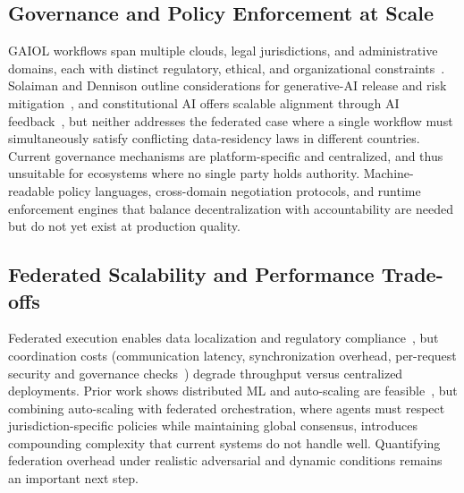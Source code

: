 \documentclass{iopjournal}
\begin{document}
\subsection{Governance and Policy Enforcement at Scale}

GAIOL workflows span multiple clouds, legal jurisdictions, and administrative domains, each with distinct regulatory, ethical, and organizational constraints~\cite{FM_Governance, FedLearn}. Solaiman and Dennison outline considerations for generative-AI release and risk mitigation~\cite{SafetyTaxonomy_FAccT23}, and constitutional AI offers scalable alignment through AI feedback~\cite{bai2022constitutional}, but neither addresses the federated case where a single workflow must simultaneously satisfy conflicting data-residency laws in different countries. Current governance mechanisms are platform-specific and centralized, and thus unsuitable for ecosystems where no single party holds authority. Machine-readable policy languages, cross-domain negotiation protocols, and runtime enforcement engines that balance decentralization with accountability are needed but do not yet exist at production quality.

\subsection{Federated Scalability and Performance Trade-offs}

Federated execution enables data localization and regulatory compliance~\cite{FedLearn}, but coordination costs (communication latency, synchronization overhead, per-request security and governance checks~\cite{NISTZTA}) degrade throughput versus centralized deployments. Prior work shows distributed ML and auto-scaling are feasible~\cite{FedML_MLSys22, Autoscaling_MAS}, but combining auto-scaling with federated orchestration, where agents must respect jurisdiction-specific policies while maintaining global consensus, introduces compounding complexity that current systems do not handle well. Quantifying federation overhead under realistic adversarial and dynamic conditions remains an important next step.
\end{document}
